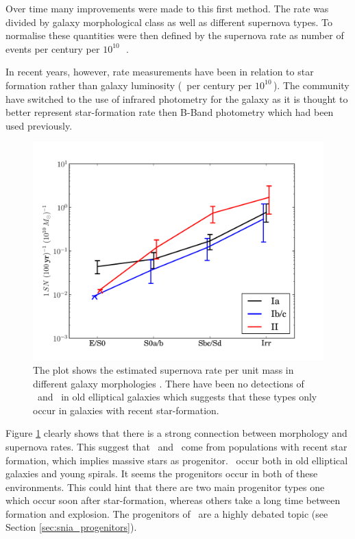 Over time many improvements were made to this first method. The rate was divided by galaxy morphological class as well as different supernova types. To normalise these quantities were then defined by the supernova rate as number of events per century per $10^{10}$\,\lsun\ \citep[e.g.][]{1991ARA&A..29..363V,1994ApJS...92..487T}. 

In recent years, however, rate measurements have been in relation to star formation rather than galaxy luminosity (\sn\ per century per $10^{10}$\,\msun).  The community \citep[e.g.][]{2005A&A...433..807M} have switched to the use of infrared photometry for the galaxy as it is thought to better represent star-formation rate then B-Band photometry \citep{2003A&A...410...83H} which had been used previously. 
\begin{figure}[htbp] %
   \centering
   \includegraphics[width=\textwidth]{chapter_intro/plots/snrates_mannucci05.pdf} 
   \caption{The plot shows the estimated supernova rate per unit mass in different galaxy morphologies \citep{2005A&A...433..807M}. There have been no detections of \sneibc\ and \sneii\ in old elliptical galaxies which suggests that these types only occur in galaxies with recent star-formation.}
   \label{fig:snrates_mannucci05}
\end{figure}

Figure \ref{fig:snrates_mannucci05} clearly shows that there is a strong connection between morphology and supernova rates. This suggest that \sneii\ and \sneibc\ come from populations with recent star formation, which implies massive stars as progenitor. \sneia\ occur both in old elliptical galaxies and young spirals. It seems the progenitors occur in both of these environments. This could hint that there are two main progenitor types one which occur soon after star-formation, whereas others take a long time between formation and explosion. The progenitors of \sneia\ are a highly debated topic (see Section \ref{sec:snia_progenitors}).

